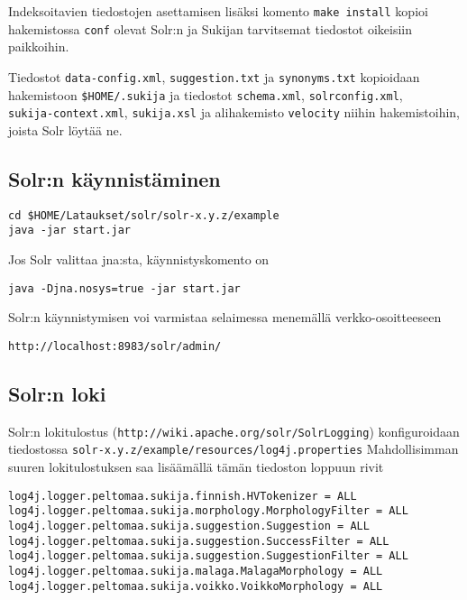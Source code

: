 \documentclass[12pt,a4paper]{scrartcl}
\begin{document}
Indeksoitavien tiedostojen asettamisen lisäksi komento
\verb=make install= kopioi hakemistossa \verb=conf= olevat Solr:n ja
Sukijan tarvitsemat tiedostot oikeisiin paikkoihin.

Tiedostot
\verb=data-config.xml=,
\verb=suggestion.txt= ja
\verb=synonyms.txt=
kopioidaan hakemistoon \verb=$HOME/.sukija=
ja tiedostot
\verb=schema.xml=,
\verb=solrconfig.xml=, \\
\verb=sukija-context.xml=,
\verb=sukija.xsl= ja
alihakemisto \verb=velocity=
niihin hakemistoihin, joista Solr löytää ne.


\subsection*{Solr:n käynnistäminen}

\begin{verbatim}
cd $HOME/Lataukset/solr/solr-x.y.z/example
java -jar start.jar
\end{verbatim}

Jos Solr valittaa jna:sta, käynnistyskomento on

\begin{verbatim}
java -Djna.nosys=true -jar start.jar
\end{verbatim}

Solr:n käynnistymisen voi varmistaa selaimessa menemällä verkko-osoitteeseen

\verb|http://localhost:8983/solr/admin/|


\subsection*{Solr:n loki}

Solr:n lokitulostus (\verb=http://wiki.apache.org/solr/SolrLogging=)
konfiguroidaan tiedostossa
\verb=solr-x.y.z/example/resources/log4j.properties=
Mahdollisimman suuren lokitulostuksen saa lisäämällä tämän tiedoston
loppuun rivit

\begin{verbatim}
log4j.logger.peltomaa.sukija.finnish.HVTokenizer = ALL
log4j.logger.peltomaa.sukija.morphology.MorphologyFilter = ALL
log4j.logger.peltomaa.sukija.suggestion.Suggestion = ALL
log4j.logger.peltomaa.sukija.suggestion.SuccessFilter = ALL
log4j.logger.peltomaa.sukija.suggestion.SuggestionFilter = ALL
log4j.logger.peltomaa.sukija.malaga.MalagaMorphology = ALL
log4j.logger.peltomaa.sukija.voikko.VoikkoMorphology = ALL
\end{verbatim}
\end{document}
